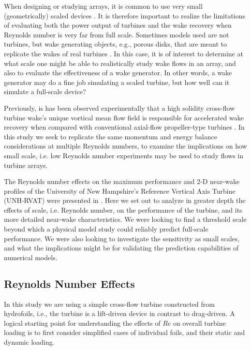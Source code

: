 \documentclass[energies,article,accept,moreauthors,pdftex,12pt,a4paper]{mdpi}
\begin{document}
When designing or studying arrays, it is common to use very small
(geometrically) scaled devices \cite{Chamorro2011, Chamorro2011b}. It is
therefore important to realize the limitations of evaluating both the power
output of turbines and the wake recovery when Reynolds number is very far from
full scale. Sometimes models used are not turbines, but wake generating objects,
e.g., porous disks, that are meant to replicate the wakes of real turbines
\cite{Goldenberg1983}. In this case, it is of interest to determine at what
scale one might be able to realistically study wake flows in an array, and also
to evaluate the effectiveness of a wake generator. In other words, a wake
generator may do a fine job simulating a scaled turbine, but how well can it
simulate a full-scale device?

Previously, is has been observed experimentally that a high solidity cross-flow
turbine wake's unique vortical mean flow field is responsible for accelerated
wake recovery when compared with conventional axial-flow propeller-type turbines
\cite{Bachant2015-JoT}. In this study we seek to replicate the same momentum and
energy balance considerations at multiple Reynolds numbers, to examine the
implications on how small scale, i.e. low Reynolds number experiments may be
used to study flows in turbine arrays.

The Reynolds number effects on the maximum performance and 2-D near-wake
profiles of the University of New Hampshire's Reference Vertical Axis Turbine
(UNH-RVAT) were presented in \cite{Bachant2014}. Here we set out to
analyze in greater depth the effects of scale, i.e. Reynolds number, on the
performance of the turbine, and its more detailed near-wake characteristics. We
were looking to find a threshold scale beyond which a physical model study could
reliably predict full-scale performance. We were also looking to investigate the
sensitivity as small scales, and what the implications might be for validating
the prediction capabilities of numerical models.


\subsection{Reynolds Number Effects}

In this study we are using a simple cross-flow turbine constructed from
hydrofoils, i.e., the turbine is a lift-driven device in contrast to
drag-driven. A logical starting point for understanding the effects of $Re$ on
overall turbine loading is to first consider simplified cases of individual
foils, and their static and dynamic loading.
\end{document}
